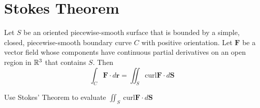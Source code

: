 \documentclass[12pt]{exam}
\newcommand{\qdate}{Stokes Theorem} %
\begin{document}
\section*{\qdate}


\begin{theorem}
    Let \(S\) be an oriented piecewise-smooth surface that is bounded by a simple, closed, piecewise-smooth boundary curve \(C\) with positive orientation. Let \(\mathbf{F}\) be a vector field whose components have continuous partial derivatives on an open region in \(\mathbb{R}^3\) that contains \(S.\) Then
    \[
        \int_{C}\mathbf{F}\cdot d\bm{r} = \iint_S \mathrm{curl}\mathbf{F}\cdot d\mathbf{S}
    \]
\end{theorem}

\begin{questions}

\question Use Stokes' Theorem to evaluate \(\iint_S~\mathrm{curl}\mathbf{F}\cdot d \mathbf{S}\)
\begin{parts}
    
\end{parts}



\end{questions}
\end{document}
